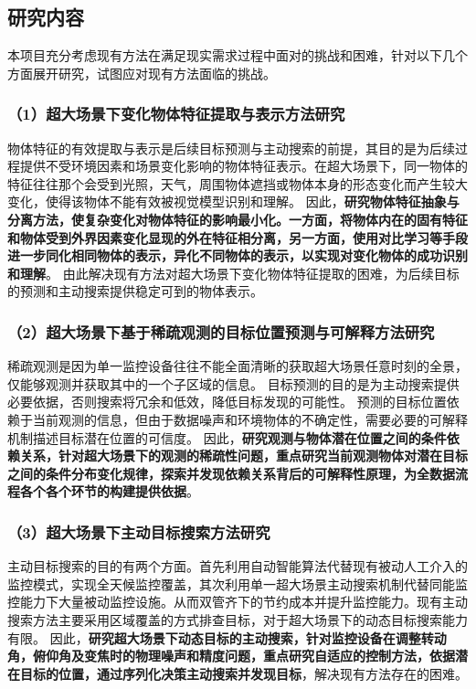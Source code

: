 \subsection{研究内容}
本项目充分考虑现有方法在满足现实需求过程中面对的挑战和困难，针对以下几个方面展开研究，试图应对现有方法面临的挑战。

\subsubsection*{\bfseries （1）超大场景下变化物体特征提取与表示方法研究}
物体特征的有效提取与表示是后续目标预测与主动搜索的前提，其目的是为后续过程提供不受环境因素和场景变化影响的物体特征表示。在超大场景下，同一物体的特征往往那个会受到光照，天气，周围物体遮挡或物体本身的形态变化而产生较大变化，使得该物体不能有效被视觉模型识别和理解。
因此，\textbf{研究物体特征抽象与分离方法，使复杂变化对物体特征的影响最小化。一方面，将物体内在的固有特征和物体受到外界因素变化显现的外在特征相分离，另一方面，使用对比学习等手段进一步同化相同物体的表示，异化不同物体的表示，以实现对变化物体的成功识别和理解}。
由此解决现有方法对超大场景下变化物体特征提取的困难，为后续目标的预测和主动搜索提供稳定可到的物体表示。


\subsubsection*{\bfseries （2）超大场景下基于稀疏观测的目标位置预测与可解释方法研究}
稀疏观测是因为单一监控设备往往不能全面清晰的获取超大场景任意时刻的全景，仅能够观测并获取其中的一个子区域的信息。
目标预测的目的是为主动搜索提供必要依据，否则搜索将冗余和低效，降低目标发现的可能性。
预测的目标位置依赖于当前观测的信息，但由于数据噪声和环境物体的不确定性，需要必要的可解释机制描述目标潜在位置的可信度。
因此，\textbf{研究观测与物体潜在位置之间的条件依赖关系，针对超大场景下的观测的稀疏性问题，重点研究当前观测物体对潜在目标之间的条件分布变化规律，探索并发现依赖关系背后的可解释性原理，为全数据流程各个各个环节的构建提供依据}。


\subsubsection*{\bfseries （3）超大场景下主动目标搜索方法研究}

主动目标搜索的目的有两个方面。首先利用自动智能算法代替现有被动人工介入的监控模式，实现全天候监控覆盖，其次利用单一超大场景主动搜索机制代替同能监控能力下大量被动监控设施。从而双管齐下的节约成本并提升监控能力。现有主动搜索方法主要采用区域覆盖的方式排查目标，对于超大场景下的动态目标搜索能力有限。
因此，\textbf{研究超大场景下动态目标的主动搜索，针对监控设备在调整转动角，俯仰角及变焦时的物理噪声和精度问题，重点研究自适应的控制方法，依据潜在目标的位置，通过序列化决策主动搜索并发现目标}，解决现有方法存在的困难。


